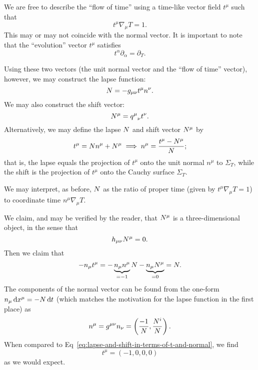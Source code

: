 We are free to describe the ``flow of time''
using a time-like vector field $t^{\mu}$ such that
\begin{equation}
t^{\mu}\nabla_{\mu}T=1.
\end{equation}
This may or may not coincide with the normal vector. It is important to
note that the ``evolution'' vector $t^{\mu}$ satisfies
\begin{equation}
t^{\alpha}\partial_{\alpha} = \partial_{T}.
\end{equation}

Using these two vectors (the unit normal vector and the ``flow of time''
vector), however, we may construct the lapse function:
\begin{equation}
N = -g_{\mu\nu}t^{\mu}n^{\nu}.
\end{equation}
We may also construct the shift vector:
\begin{equation}
N^{\mu}  = {q^{\mu}}_{\nu}t^{\nu}.
\end{equation}
Alternatively, we may define the lapse $N$ and shift vector
$N^{\mu}$ by
\begin{equation}\label{eq:lapse-and-shift-in-terms-of-t-and-normal}
t^{\mu} = N n^{\mu} + N^{\mu} \implies n^{\mu} = \frac{t^{\mu}-N^{\mu}}{N};
\end{equation}
that is, the lapse equals the projection of $t^{\mu}$ onto the unit
normal $n^{\mu}$ to $\Sigma_{T}$, while the shift is the projection of
$t^{\mu}$ onto the Cauchy surface $\Sigma_{T}$.

We may interpret, as before, $N$ as the ratio of proper time (given
by $t^{\mu}\nabla_{\mu} T=1$) to coordinate time $n^{\mu}\nabla_{\mu}T$.

We claim, and may be verified by the reader, that $N^{\mu}$ is a
three-dimensional object, in the sense that
\begin{equation}
h_{\mu\nu}N^{\mu} = 0.
\end{equation}
Then we claim that
\begin{equation}
-n_{\mu}t^{\mu} = -\underbrace{n_{\mu}n^{\mu}}_{=-1}N - \underbrace{n_{\mu}N^{\mu}}_{=0}
= N.
\end{equation}
The components of the normal vector can be found from the one-form
$n_{\mu}\,\mathrm{d} x^{\mu}=-N\,\mathrm{d} t$ (which matches the motivation for the
lapse function in the first place) as
\begin{equation}
n^{\mu} = g^{\mu\nu}n_{\nu} = \left(\frac{-1}{N},\frac{N^{i}}{N}\right).
\end{equation}
When compared to Eq~\eqref{eq:lapse-and-shift-in-terms-of-t-and-normal},
we find
\begin{equation}
t^{\mu} = (-1, 0, 0, 0)
\end{equation}
as we would expect.